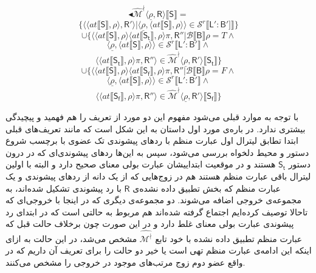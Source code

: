 $$\blacktriangleleft\mathcal{\hat{M}^\nmid} \langle \underline{\rho},\mathsf{R} \rangle \llbracket \mathsf{S} \rrbracket=$$
$$\{\langle \langle at \llbracket \mathsf{S} \rrbracket , \rho \rangle , \mathsf{R'} \rangle | \langle \underline{\rho} , \langle at \llbracket \mathsf{S} \rrbracket , \rho \rangle \rangle \in \mathcal{S}^r \llbracket \mathsf{L':B'} ]\rrbracket \}$$
$$\cup \{\langle \langle at \llbracket \mathsf{S} \rrbracket , \rho \rangle \langle at \llbracket \mathsf{S_t} \rrbracket, \rho \rangle \pi, \mathsf{R''} | \mathcal{B}\llbracket\mathsf{B} \rrbracket \rho = \mathit{T} \land$$
$$\langle \underline{\rho},\langle at \llbracket \mathsf{S} \rrbracket , \rho \rangle \rangle \in \mathcal{S}^r \llbracket \mathsf{L':B'} \rrbracket \land$$
$$\langle \langle at \llbracket \mathsf{S_t} \rrbracket , \rho \rangle \pi,\mathsf{R''} \rangle \in \mathcal{\hat{M}^\nmid} \langle \underline{\rho}, \mathsf{R'} \rangle  \llbracket \mathsf{S_t} \rrbracket \}$$
$$\cup \{\langle \langle at \llbracket \mathsf{S} \rrbracket , \rho \rangle \langle at \llbracket \mathsf{S_f} \rrbracket, \rho \rangle \pi, \mathsf{R''} | \mathcal{B}\llbracket\mathsf{B} \rrbracket \rho = \mathit{F} \land$$
$$\langle \underline{\rho},\langle at \llbracket \mathsf{S} \rrbracket , \rho \rangle \rangle \in \mathcal{S}^r \llbracket \mathsf{L':B'} \rrbracket \land$$
$$\langle \langle at \llbracket \mathsf{S_f} \rrbracket , \rho \rangle \pi,\mathsf{R''} \rangle \in \mathcal{\hat{M}^\nmid}  \langle \underline{\rho}, \mathsf{R'} \rangle \llbracket \mathsf{S_f} \rrbracket \}$$

 با توجه به موارد قبلی می‌شود مفهوم این دو مورد از تعریف را هم فهمید و پیچیدگی بیشتری ندارد. در باره‌ی مورد اول داستان به این شکل است که مانند تعریف‌های قبلی ابتدا تطابق لیترال اول عبارت منظم با رد‌های پیشوندی تک عضوی با برچسب شروع دستور و محیط دلخواه بررسی می‌شود، سپس به این‌ها ردهای پیشوندی‌ای که در درون دستور $\mathsf{S_t}$ هستند و در موقعیت ابتداییشان عبارت بولی معنای صحیح دارد و البته با اولین لیترال باقی عبارت منظم هستند هم در زوج‌هایی که از یک دانه از رد‌های پیشوندی و یک عبارت منظم که بخش تطبیق داده نشده‌ی $\mathsf{R}$ با رد پیشوندی تشکیل شده‌اند، به مجموعه‌ی خروجی اضافه می‌شوند. دو مجموعه‌ی دیگری که در اینجا با خروجی‌ای که تاحالا توصیف کرده‌ایم اجتماع گرفته‌ شده‌اند هم مربوط به حالتی است که در ابتدای رد پیشوندی عبارت بولی معنای غلط دارد و در این صورت چون برخلاف حالت قبل که عبارت منظم تطبیق داده نشده با خود تابع
 $\mathcal{\hat{M^\nmid}}$
مشخص می‌شد، در این حالت به ازای اینکه این ادامه‌ی عبارت منظم تهی است یا خیر دو حالت را برای تعریف آن داریم که در واقع عضو دوم زوج مرتب‌های موجود در خروجی را مشخص می‌کنند.
 
